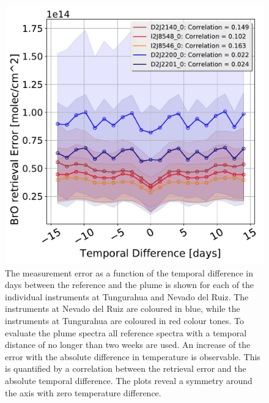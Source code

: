 \begin{figure}
	\centering
	\includegraphics[width=0.7\linewidth]{Bilder/DatallInstruments}
	\caption{The  measurement error as a function of the temporal difference in days between the reference and the plume is shown for each of the individual instruments at Tungurahua and Nevado del Ruiz. The instruments at Nevado del Ruiz are coloured in blue, while the instruments at Tungurahua are coloured in red colour tones.  To evaluate the plume spectra all reference spectra with a temporal distance of no longer than two weeks are used. An increase of the  error with the absolute difference in temperature is observable. This is quantified by a correlation between the  retrieval error and the absolute temporal difference. The plots reveal a symmetry around the axis with zero temperature difference.}
	\label{fig:datallinstruments}
\end{figure}


